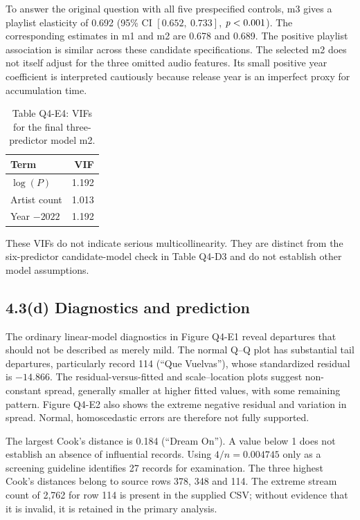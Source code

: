 To answer the original question with all five prespecified controls, m3 gives a playlist elasticity of 0.692 (95\% CI $[0.652,\ 0.733]$, $\mathit{p}<0.001$). The corresponding estimates in m1 and m2 are 0.678 and 0.689. The positive playlist association is similar across these candidate specifications. The selected m2 does not itself adjust for the three omitted audio features. Its small positive year coefficient is interpreted cautiously because release year is an imperfect proxy for accumulation time.

\begin{table}[htbp]\centering
\caption*{Table Q4-E4: VIFs for the final three-predictor model m2.}
\begin{tabular}{lr}\toprule
Term & VIF \\\midrule
$\log(P)$ & 1.192 \\
Artist count & 1.013 \\
Year $-2022$ & 1.192 \\\bottomrule
\end{tabular}\end{table}

These VIFs do not indicate serious multicollinearity. They are distinct from the six-predictor candidate-model check in Table Q4-D3 and do not establish other model assumptions.

\FloatBarrier
\subsection*{4.3(d) Diagnostics and prediction}

The ordinary linear-model diagnostics in Figure Q4-E1 reveal departures that should not be described as merely mild. The normal Q--Q plot has substantial tail departures, particularly record 114 (``Que Vuelvas''), whose standardized residual is $-14.866$. The residual-versus-fitted and scale--location plots suggest non-constant spread, generally smaller at higher fitted values, with some remaining pattern. Figure Q4-E2 also shows the extreme negative residual and variation in spread. Normal, homoscedastic errors are therefore not fully supported.

The largest Cook's distance is 0.184 (``Dream On''). A value below 1 does not establish an absence of influential records. Using $4/n=0.004745$ only as a screening guideline identifies 27 records for examination. The three highest Cook's distances belong to source rows 378, 348 and 114. The extreme stream count of 2,762 for row 114 is present in the supplied CSV; without evidence that it is invalid, it is retained in the primary analysis.

